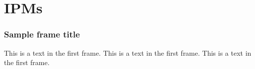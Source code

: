 \section{IPMs }
\begin{frame}
  \frametitle{Sample frame title}
  This is a text in the first frame. This is a text in the first frame. This is a text in the first frame.
\end{frame}